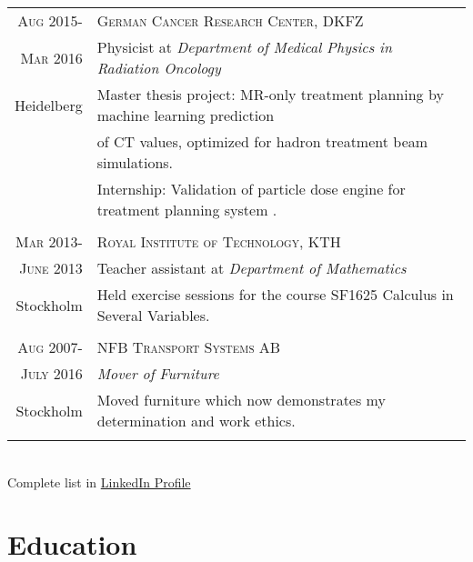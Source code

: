 \documentclass[a4paper,10pt]{article}
\newcommand{\MYhref}[3][blue]{\href{#2}{\color{#1}{#3}}}%
\begin{document}
{\begin{tabular}{r|p{16cm}}

 
 
 
 
 
 
 \textsc{Aug} 2015- & \textsc{German Cancer Research Center, DKFZ} \\
 \textsc{Mar} 2016& Physicist at \emph{Department of Medical Physics in Radiation Oncology}\\
 Heidelberg &\footnotesize{ Master thesis project:  MR-only treatment planning by machine learning prediction } \\
 & \footnotesize{of CT values, optimized for hadron treatment beam simulations.} \\
 & \footnotesize{Internship: Validation of particle dose engine for treatment planning system \MYhref{ https://aapm.onlinelibrary.wiley.com/doi/abs/10.1002/mp.12251@10.1002/(ISSN)2473-4209.EDITORS_CHOICE}{matRad}.} \\
 \\

 
 \textsc{Mar} 2013- & \textsc{Royal Institute of Technology, KTH}\\
 \textsc{June} 2013 &Teacher assistant at \emph{Department of Mathematics}\\
 Stockholm&\footnotesize{Held exercise sessions for the course SF1625 Calculus in Several Variables. }\\ \\
 
 
 
\textsc{Aug} 2007- & \textsc{NFB Transport Systems AB}\\
 \textsc{July} 2016 & \emph{Mover of Furniture} \\
 
Stockholm & \footnotesize{Moved furniture which now demonstrates my determination and work ethics.} \\
  \\
\end{tabular}
\\
{\setlength\parindent{80pt} { \tiny Complete list in  \href{http://www.linkedin.com/in/danielbjorkman88}{LinkedIn Profile}} }
 \\
\section{Education}
 
}
\end{document}
